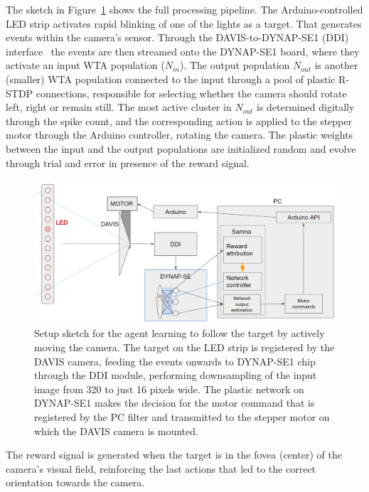 The sketch in Figure~\ref{fig:camera_closed_loop_setup_sketch} shows the full processing pipeline. The Arduino-controlled LED strip activates rapid blinking of one of the lights as a target. That generates events within the camera's sensor. Through the DAVIS-to-DYNAP-SE1 (DDI) interface~\cite{Risi_etal21} the events are then streamed onto the DYNAP-SE1 board, where they activate an input WTA population ($N_{in}$). The output population $N_{out}$ is another (smaller) WTA population connected to the input through a pool of plastic R-STDP connections, responsible for selecting whether the camera should rotate left, right or remain still. The most active cluster in $N_{out}$ is determined digitally through the spike count, and the corresponding action is applied to the stepper motor through the Arduino controller, rotating the camera. The plastic weights between the input and the output populations are initialized random and evolve through trial and error in presence of the reward signal.

\begin{figure}[h]
  \centering
    \includegraphics[width=\linewidth]{img/chapter5/Caterinas_setup_sketch.png}
    \caption[Closed loop setup for the DVS following task architecture sketch]{Setup sketch for the agent learning to follow the target by actively moving the camera. The target on the LED strip is registered by the DAVIS camera, feeding the events onwards to DYNAP-SE1 chip through the DDI module, performing downsampling of the input image from 320 to just 16 pixels wide. The plastic network on DYNAP-SE1 makes the decision for the motor command that is registered by the PC filter and transmitted to the stepper motor on which the DAVIS camera is mounted.}
  \label{fig:camera_closed_loop_setup_sketch}
\end{figure}

The reward signal is generated when the target is in the fovea (center) of the camera's visual field, reinforcing the last actions that led to the correct orientation towards the camera.

